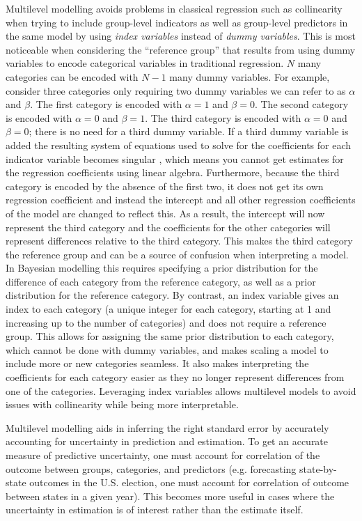 Multilevel modelling avoids problems in classical regression such as collinearity when trying to include group-level indicators as well as group-level predictors in the same model by using \textit{index variables} instead of \textit{dummy variables}. This is most noticeable when considering the ``reference group'' that results from using dummy variables to encode categorical variables in traditional regression. $N$ many categories can be encoded with $N-1$ many dummy variables. For example, consider three categories only requiring two dummy variables we can refer to as $\alpha$ and $\beta$. The first category is encoded with $\alpha = 1$ and $\beta = 0$. The second category is encoded with $\alpha = 0$ and $\beta = 1$. The third category is encoded with $\alpha = 0$ and $\beta = 0$; there is no need for a third dummy variable. If a third dummy variable is added the resulting system of equations used to solve for the coefficients for each indicator variable becomes singular \cite{Fox2008}, which means you cannot get estimates for the regression coefficients using linear algebra. Furthermore, because the third category is encoded by the absence of the first two, it does not get its own regression coefficient and instead the intercept and all other regression coefficients of the model are changed to reflect this. As a result, the intercept will now represent the third category and the coefficients for the other categories will represent differences relative to the third category. This makes the third category the reference group and can be a source of confusion when interpreting a model. In Bayesian modelling this requires specifying a prior distribution for the difference of each category from the reference category, as well as a prior distribution for the reference category. By contrast, an index variable gives an index to each category (a unique integer for each category, starting at 1 and increasing up to the number of categories) and does not require a reference group. This allows for assigning the same prior distribution to each category, which cannot be done with dummy variables, and makes scaling a model to include more or new categories seamless. It also makes interpreting the coefficients for each category easier as they no longer represent differences from one of the categories. Leveraging index variables allows multilevel models to avoid issues with collinearity while being more interpretable.

Multilevel modelling aids in inferring the right standard error by accurately accounting for uncertainty in prediction and estimation. To get an accurate measure of predictive uncertainty, one must account for correlation of the outcome between groups, categories, and predictors (e.g. forecasting state-by-state outcomes in the U.S. election, one must account for correlation of outcome between states in a given year). This becomes more useful in cases where the uncertainty in estimation is of interest rather than the estimate itself.

